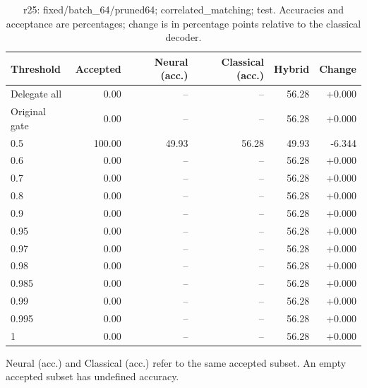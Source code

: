 \begin{table}[htbp]
\centering\small
\setlength{\tabcolsep}{3pt}
\caption{r25: fixed/batch\_64/pruned64; correlated\_matching; test. Accuracies and acceptance are percentages; change is in percentage points relative to the classical decoder.}
\begin{tabular}{lrrrrr}
\toprule
Threshold & Accepted & Neural (acc.) & Classical (acc.) & Hybrid & Change \\
\midrule
Delegate all & 0.00 & -- & -- & 56.28 & +0.000 \\
Original gate & 0.00 & -- & -- & 56.28 & +0.000 \\
0.5 & 100.00 & 49.93 & 56.28 & 49.93 & -6.344 \\
0.6 & 0.00 & -- & -- & 56.28 & +0.000 \\
0.7 & 0.00 & -- & -- & 56.28 & +0.000 \\
0.8 & 0.00 & -- & -- & 56.28 & +0.000 \\
0.9 & 0.00 & -- & -- & 56.28 & +0.000 \\
0.95 & 0.00 & -- & -- & 56.28 & +0.000 \\
0.97 & 0.00 & -- & -- & 56.28 & +0.000 \\
0.98 & 0.00 & -- & -- & 56.28 & +0.000 \\
0.985 & 0.00 & -- & -- & 56.28 & +0.000 \\
0.99 & 0.00 & -- & -- & 56.28 & +0.000 \\
0.995 & 0.00 & -- & -- & 56.28 & +0.000 \\
1 & 0.00 & -- & -- & 56.28 & +0.000 \\
\bottomrule
\end{tabular}
\par\smallskip\footnotesize Neural (acc.) and Classical (acc.) refer to the same accepted subset. An empty accepted subset has undefined accuracy.
\end{table}
